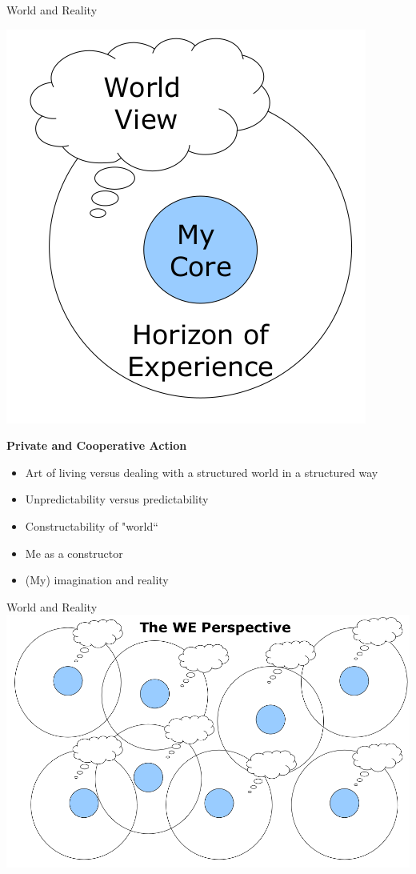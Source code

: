 \documentclass{beamer}
\newcommand{\ueberschrift}[1]{\begin{center}\bf #1\end{center}}
\begin{document}
\begin{frame}{World and Reality}

  \begin{minipage}{.4\textwidth}\centering
    \includegraphics[width=\textwidth]{Bilder/DI-1.png}
  \end{minipage}\hfill
  \begin{minipage}{.55\textwidth}
    \ueberschrift{Private and Cooperative Action}
    \begin{itemize}
    \item Art of living versus dealing with a structured world in a structured
      way
    \item Unpredictability versus predictability
    \item Constructability of "world“
    \item Me as a constructor
    \item (My) imagination and reality
    \end{itemize}
  \end{minipage}

\end{frame}
\begin{frame}{World and Reality}\centering
    \includegraphics[width=.9\textwidth]{Bilder/DI-2.png}
\end{frame}
\end{document}
